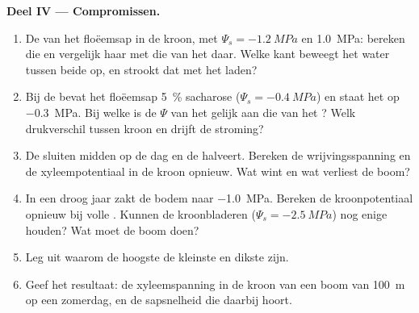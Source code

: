 \begin{problem}
\medskip
\noindent\textbf{Deel IV --- Compromissen.}
\begin{enumerate}[resume]
  \item De  van het floëemsap in de kroon, met
        $\Psi_s = \qty{-1.2}{MPa}$ en  \qty{1.0}{MPa}: bereken die
        en vergelijk haar met die van het  daar. Welke kant beweegt
        het water tussen beide op, en strookt dat met het laden?
  \item Bij de  bevat het floëemsap \qty{5}{\%} sacharose ($\Psi_s =
        \qty{-0.4}{MPa}$) en staat het  op \qty{-0.3}{MPa}. Bij
        welke  is de $\Psi$ van het  gelijk aan die van het
        ? Welk drukverschil tussen kroon en  drijft de
        stroming?
  \item De  sluiten midden op de dag en de 
        halveert. Bereken de wrijvingsspanning en de xyleempotentiaal in
        de kroon opnieuw. Wat wint en wat verliest de boom?
  \item In een droog jaar zakt de bodem naar \qty{-1.0}{MPa}. Bereken de
        kroonpotentiaal opnieuw bij volle . Kunnen de
        kroonbladeren ($\Psi_s = \qty{-2.5}{MPa}$) nog enige 
        houden? Wat moet de boom doen?
  \item Leg uit waarom de hoogste  de kleinste en dikste zijn.
  \item Geef het resultaat: de xyleemspanning in de kroon van een boom van
        \qty{100}{m} op een zomerdag, en de sapsnelheid die daarbij hoort.
\end{enumerate}
\end{problem}
